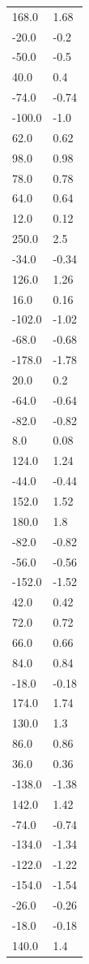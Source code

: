 \begin{longtable}{ll}
168.0 & 1.68 \\
-20.0 & -0.2 \\
-50.0 & -0.5 \\
40.0 & 0.4 \\
-74.0 & -0.74 \\
-100.0 & -1.0 \\
62.0 & 0.62 \\
98.0 & 0.98 \\
78.0 & 0.78 \\
64.0 & 0.64 \\
12.0 & 0.12 \\
250.0 & 2.5 \\
-34.0 & -0.34 \\
126.0 & 1.26 \\
16.0 & 0.16 \\
-102.0 & -1.02 \\
-68.0 & -0.68 \\
-178.0 & -1.78 \\
20.0 & 0.2 \\
-64.0 & -0.64 \\
-82.0 & -0.82 \\
8.0 & 0.08 \\
124.0 & 1.24 \\
-44.0 & -0.44 \\
152.0 & 1.52 \\
180.0 & 1.8 \\
-82.0 & -0.82 \\
-56.0 & -0.56 \\
-152.0 & -1.52 \\
42.0 & 0.42 \\
72.0 & 0.72 \\
66.0 & 0.66 \\
84.0 & 0.84 \\
-18.0 & -0.18 \\
174.0 & 1.74 \\
130.0 & 1.3 \\
86.0 & 0.86 \\
36.0 & 0.36 \\
-138.0 & -1.38 \\
142.0 & 1.42 \\
-74.0 & -0.74 \\
-134.0 & -1.34 \\
-122.0 & -1.22 \\
-154.0 & -1.54 \\
-26.0 & -0.26 \\
-18.0 & -0.18 \\
140.0 & 1.4 \\

\end{longtable}
